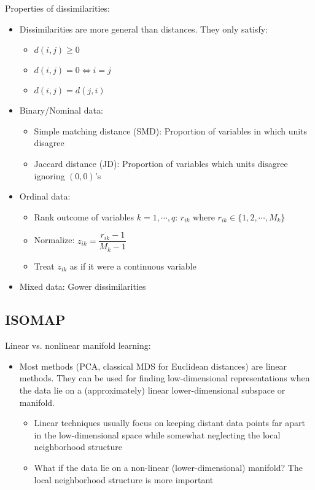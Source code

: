 \documentclass[a4paper]{article}
\begin{document}
Properties of dissimilarities:
\begin{itemize}
    \item Dissimilarities are more general than distances. They only satisfy:
    \begin{itemize}
        \item $d(i,j)\geq 0$
        \item $d(i,j)=0 \Longleftrightarrow i=j$
        \item $d(i,j)=d(j,i)$
    \end{itemize}
    \item Binary/Nominal data:
    \begin{itemize}
        \item Simple matching distance (SMD): Proportion of variables in which units disagree
        \item Jaccard distance (JD): Proportion of variables which units disagree ignoring $(0,0)$'s
    \end{itemize}
    \item Ordinal data:
    \begin{itemize}
        \item Rank outcome of variables $k=1,\cdots,q$: $r_{ik}$ where $r_{ik}\in\{1,2,\cdots,M_k \}$
        \item Normalize: $z_{ik}=\dfrac{r_{ik}-1}{M_k-1}$
        \item Treat $z_{ik}$ as if it were a continuous variable
    \end{itemize}
    \item Mixed data: Gower dissimilarities
\end{itemize}

\subsection{ISOMAP}

Linear vs. nonlinear manifold learning:
\begin{itemize}
    \item Most methods (PCA, classical MDS for Euclidean distances) are linear methods. They can be used for finding low-dimensional representations when the data lie on a (approximately) linear lower-dimensional subspace or manifold.
    \begin{itemize}
        \item Linear techniques usually focus on keeping distant data points far apart in the low-dimensional space while somewhat neglecting the local neighborhood structure
        \item What if the data lie on a non-linear (lower-dimensional) manifold? The local neighborhood structure is more important
    \end{itemize}
\end{itemize}
\end{document}
